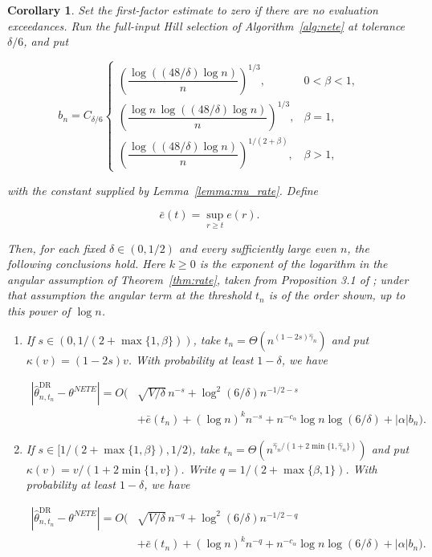\documentclass[12pt]{article}
\theoremstyle{plain}
\newtheorem{corollary}[theorem]{Corollary}
\theoremstyle{definition}
\begin{document}
\begin{corollary}
Set the first-factor estimate to zero if there are no evaluation exceedances. Run the full-input Hill selection of Algorithm~\ref{alg:nete} at tolerance $\delta/6$, and put

\[
b_n=C_{\delta/6}\begin{cases}
\left(\dfrac{\log((48/\delta)\log n)}{n}\right)^{1/3},&0<\beta<1,\\
\left(\dfrac{\log n\,\log((48/\delta)\log n)}{n}\right)^{1/3},&\beta=1,\\
\left(\dfrac{\log((48/\delta)\log n)}{n}\right)^{1/(2+\beta)},&\beta>1,
\end{cases}
\]

with the constant supplied by Lemma~\ref{lemma:mu_rate}. Define

\[
\bar e(t)=\sup_{r\geq t}e(r).
\]

Then, for each fixed $\delta\in(0,1/2)$ and every sufficiently large even $n$, the following conclusions hold. Here $k\geq0$ is the exponent of the logarithm in the angular assumption of Theorem~\ref{thm:rate}, taken from Proposition 3.1 of \citet{zhang2023wasserstein}; under that assumption the angular term at the threshold $t_n$ is of the order shown, up to this power of $\log n$.
\begin{enumerate}
    \item If $s\in(0,1/(2+\max\{1,\beta\}))$, take $t_n=\Theta(n^{(1-2s)\hat\gamma_n})$ and put $\kappa(v)=(1-2s)v$. With probability at least $1-\delta$, we have

\[
\begin{aligned}
|\widehat\theta_{n,t_n}^{\text{DR}}-\theta^{NETE}|=O\bigl(&\sqrt{V/\delta}\,n^{-s}+\log^2(6/\delta)n^{-1/2-s}\\
&+\bar e(t_n)+(\log n)^k n^{-s}+n^{-c_\alpha}\log n\log(6/\delta)+|\alpha|b_n\bigr).
\end{aligned}
\]

    \item If $s\in[1/(2+\max\{1,\beta\}),1/2)$, take $t_n=\Theta(n^{\hat\gamma_n/(1+2\min\{1,\hat\gamma_n\})})$ and put $\kappa(v)=v/(1+2\min\{1,v\})$. Write $q=1/(2+\max\{\beta,1\})$. With probability at least $1-\delta$, we have

\[
\begin{aligned}
|\widehat\theta_{n,t_n}^{\text{DR}}-\theta^{NETE}|=O\bigl(&\sqrt{V/\delta}\,n^{-q}+\log^2(6/\delta)n^{-1/2-q}\\
&+\bar e(t_n)+(\log n)^k n^{-q}+n^{-c_\alpha}\log n\log(6/\delta)+|\alpha|b_n\bigr).
\end{aligned}
\]

  \end{enumerate}
\end{corollary}
\end{document}
